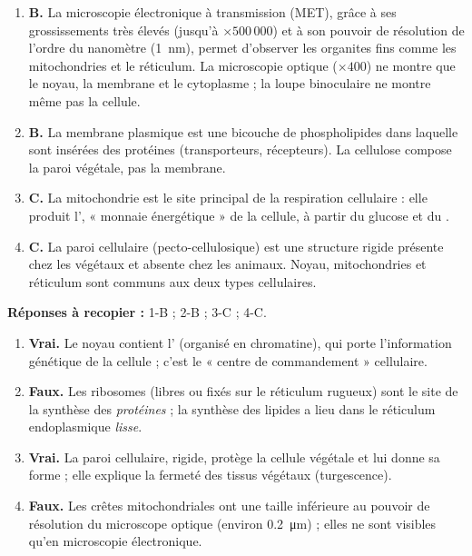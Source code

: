 \documentclass[11pt]{article}
\newcommand{\cle}[1]{{\popxbold\color{popdark}#1}}
\begin{document}
\begin{corrige}
\begin{enumerate}
    \item \textbf{B.} La microscopie électronique à transmission (MET), grâce à ses grossissements très élevés (jusqu'à $\times 500\,000$) et à son pouvoir de résolution de l'ordre du nanomètre (\SI{1}{\nano\meter}), permet d'observer les organites fins comme les mitochondries et le réticulum. La microscopie optique ($\times 400$) ne montre que le noyau, la membrane et le cytoplasme ; la loupe binoculaire ne montre même pas la cellule.
    \item \textbf{B.} La membrane plasmique est une bicouche de \cle{phospholipides} dans laquelle sont insérées des \cle{protéines} (transporteurs, récepteurs). La cellulose compose la paroi végétale, pas la membrane.
    \item \textbf{C.} La \cle{mitochondrie} est le site principal de la respiration cellulaire : elle produit l', « monnaie énergétique » de la cellule, à partir du glucose et du .
    \item \textbf{C.} La \cle{paroi cellulaire} (pecto-cellulosique) est une structure rigide présente chez les végétaux et absente chez les animaux. Noyau, mitochondries et réticulum sont communs aux deux types cellulaires.
\end{enumerate}
\textbf{Réponses à recopier :} 1-B ; 2-B ; 3-C ; 4-C.
\end{corrige}

\begin{corrige}
\begin{enumerate}
    \item \textbf{Vrai.} Le noyau contient l' (organisé en chromatine), qui porte l'information génétique de la cellule ; c'est le « centre de commandement » cellulaire.
    \item \textbf{Faux.} Les ribosomes (libres ou fixés sur le réticulum rugueux) sont le site de la synthèse des \emph{protéines} ; la synthèse des lipides a lieu dans le réticulum endoplasmique \emph{lisse}.
    \item \textbf{Vrai.} La paroi cellulaire, rigide, protège la cellule végétale et lui donne sa forme ; elle explique la fermeté des tissus végétaux (turgescence).
    \item \textbf{Faux.} Les crêtes mitochondriales ont une taille inférieure au pouvoir de résolution du microscope optique (environ \SI{0,2}{\micro\meter}) ; elles ne sont visibles qu'en microscopie électronique.
\end{enumerate}
\end{corrige}
\end{document}
